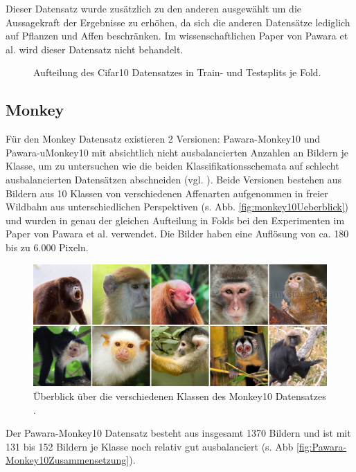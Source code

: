Dieser Datensatz wurde zusätzlich zu den anderen ausgewählt um die Aussagekraft der Ergebnisse zu erhöhen, da sich die anderen Datensätze lediglich auf Pflanzen und Affen beschränken. Im wissenschaftlichen Paper von Pawara et al. \cite{pawaraPaper} wird dieser Datensatz nicht behandelt.

\begin{figure}[H]
\begin{adjustbox}{width=1.4\textwidth, center}

\end{adjustbox}
\caption{Aufteilung des Cifar10 Datensatzes \cite{cifar10} in Train- und Testsplits je Fold.}
\label{fig:Cifar10Zusammensetzung}
\end{figure}


\subsection{Monkey}
Für den Monkey Datensatz existieren 2 Versionen: Pawara-Monkey10 und Pawara-uMonkey10 mit absichtlich nicht ausbalancierten Anzahlen an Bildern je Klasse, um zu untersuchen wie die beiden Klassifikationsschemata auf schlecht ausbalancierten Datensätzen abschneiden (vgl. \cite{pawaraWebsiteDatensaetze}). Beide Versionen bestehen aus Bildern aus 10 Klassen von verschiedenen Affenarten aufgenommen in freier Wildbahn aus unterschiedlichen Perspektiven (s. Abb. \ref{fig:monkey10Ueberblick}) und wurden in genau der gleichen Aufteilung in Folds bei den Experimenten im Paper von Pawara et al. \cite{pawaraPaper} verwendet.
Die Bilder haben eine Auflösung von ca. 180 bis zu 6.000 Pixeln.
\begin{figure}[H]
\centering
\includegraphics[scale=0.08]{img/2_monkey10-image.jpg}
\caption{Überblick über die verschiedenen Klassen des Monkey10 Datensatzes \cite{pawaraMonkey}.}
\label{fig:monkeyUeberblick}
\end{figure}

Der Pawara-Monkey10 Datensatz besteht aus insgesamt 1370 Bildern und ist mit 131 bis 152 Bildern je Klasse noch relativ gut ausbalanciert (s. Abb \ref{fig:Pawara-Monkey10Zusammensetzung}).\\

